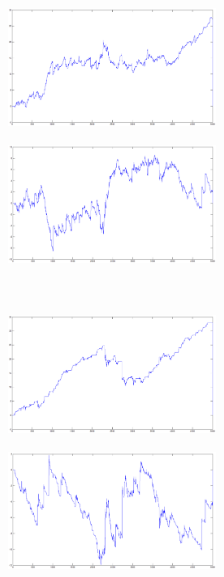 \documentclass{tewiart}
\begin{document}
\begin{figure}[h]
\centering
\begin{minipage}{\linewidth}
\centering
\includegraphics[width=0.49\textwidth]{images/chfjpyA.eps}
\label{jedno}
\end{minipage}
\begin{minipage}{\linewidth}
\centering
\includegraphics[width=0.49\textwidth]{images/chfjpyB.eps}
\label{dwu}
\end{minipage}
\\
\begin{minipage}{\linewidth}
\centering
\includegraphics[width=0.49\textwidth]{images/chfjpyC.eps}
\label{cztero}
\end{minipage}
\begin{minipage}{\linewidth}
\centering
\includegraphics[width=0.49\textwidth]{images/chfjpyD.eps}
\label{mansard}
\end{minipage}

\end{figure}
\end{document}
